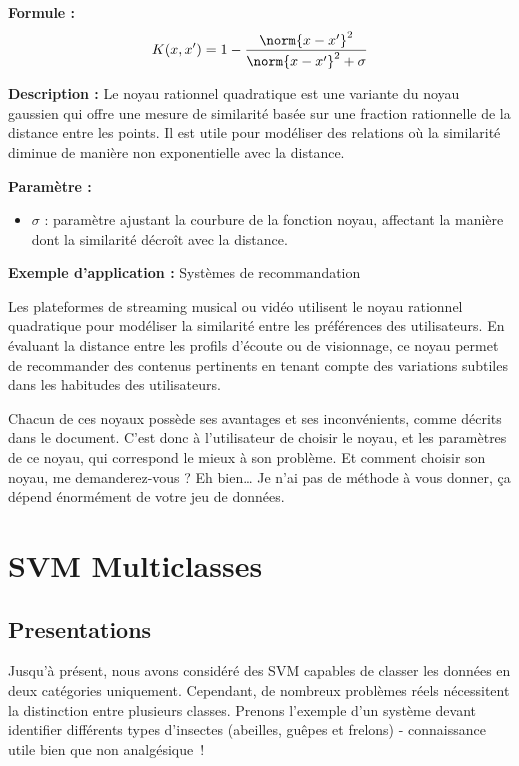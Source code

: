 \textbf{Formule :}
\begin{equation}
K(x, x') = 1 - \frac{\norm{x - x'}^2}{\norm{x - x'}^2 + \sigma}
\label{eq:noyau_rationnel}
\end{equation}

\textbf{Description :} Le noyau rationnel quadratique est une variante du noyau gaussien qui offre une mesure de similarité basée sur une fraction rationnelle de la distance entre les points. Il est utile pour modéliser des relations où la similarité diminue de manière non exponentielle avec la distance.

\textbf{Paramètre :}
\begin{itemize}
\item $\sigma$ : paramètre ajustant la courbure de la fonction noyau, affectant la manière dont la similarité décroît avec la distance.
\end{itemize}

\textbf{Exemple d'application :} Systèmes de recommandation

Les plateformes de streaming musical ou vidéo utilisent le noyau rationnel quadratique pour modéliser la similarité entre les préférences des utilisateurs. En évaluant la distance entre les profils d'écoute ou de visionnage, ce noyau permet de recommander des contenus pertinents en tenant compte des variations subtiles dans les habitudes des utilisateurs.

\vspace{1em}

Chacun de ces noyaux possède ses avantages et ses inconvénients, comme décrits dans le document. C'est donc à l'utilisateur de choisir le noyau, et les paramètres de ce noyau, qui correspond le mieux à son problème. Et comment choisir son noyau, me demanderez-vous ? Eh bien\ldots{} Je n'ai pas de méthode à vous donner, ça dépend énormément de votre jeu de données.

\section{SVM Multiclasses}

\subsection{Presentations}

Jusqu'à présent, nous avons considéré des SVM capables de classer les données en deux catégories uniquement. Cependant, de nombreux problèmes réels nécessitent la distinction entre plusieurs classes. Prenons l'exemple d'un système devant identifier différents types d'insectes (abeilles, guêpes et frelons) - connaissance utile bien que non analgésique~!

